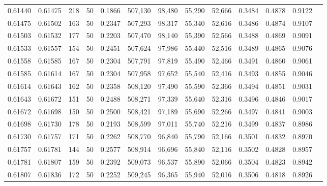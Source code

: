 \begin{tabular}{rrrrrrrrrrrrr}
0.61440 & 0.61475 &   218 &  50 &                                     0.1866 & 507,130 &  98,480 &  55,290 &  52,666 & 0.3484 & 0.4878 & 0.9122 \\
0.61475 & 0.61502 &   163 &  50 &                                     0.2347 & 507,293 &  98,317 &  55,340 &  52,616 & 0.3486 & 0.4874 & 0.9107 \\
0.61503 & 0.61532 &   177 &  50 &                                     0.2203 & 507,470 &  98,140 &  55,390 &  52,566 & 0.3488 & 0.4869 & 0.9091 \\
0.61533 & 0.61557 &   154 &  50 &                                     0.2451 & 507,624 &  97,986 &  55,440 &  52,516 & 0.3489 & 0.4865 & 0.9076 \\
0.61558 & 0.61585 &   167 &  50 &                                     0.2304 & 507,791 &  97,819 &  55,490 &  52,466 & 0.3491 & 0.4860 & 0.9061 \\
0.61585 & 0.61614 &   167 &  50 &                                     0.2304 & 507,958 &  97,652 &  55,540 &  52,416 & 0.3493 & 0.4855 & 0.9046 \\
0.61614 & 0.61643 &   162 &  50 &                                     0.2358 & 508,120 &  97,490 &  55,590 &  52,366 & 0.3494 & 0.4851 & 0.9031 \\
0.61643 & 0.61672 &   151 &  50 &                                     0.2488 & 508,271 &  97,339 &  55,640 &  52,316 & 0.3496 & 0.4846 & 0.9017 \\
0.61672 & 0.61698 &   150 &  50 &                                     0.2500 & 508,421 &  97,189 &  55,690 &  52,266 & 0.3497 & 0.4841 & 0.9003 \\
0.61698 & 0.61730 &   178 &  50 &                                     0.2193 & 508,599 &  97,011 &  55,740 &  52,216 & 0.3499 & 0.4837 & 0.8986 \\
0.61730 & 0.61757 &   171 &  50 &                                     0.2262 & 508,770 &  96,840 &  55,790 &  52,166 & 0.3501 & 0.4832 & 0.8970 \\
0.61757 & 0.61781 &   144 &  50 &                                     0.2577 & 508,914 &  96,696 &  55,840 &  52,116 & 0.3502 & 0.4828 & 0.8957 \\
0.61781 & 0.61807 &   159 &  50 &                                     0.2392 & 509,073 &  96,537 &  55,890 &  52,066 & 0.3504 & 0.4823 & 0.8942 \\
0.61807 & 0.61836 &   172 &  50 &                                     0.2252 & 509,245 &  96,365 &  55,940 &  52,016 & 0.3506 & 0.4818 & 0.8926 \\

\end{tabular}
